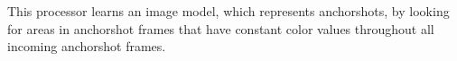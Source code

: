 This processor learns an image model, which represents anchorshots, by looking for areas in anchorshot frames that have constant color values throughout all incoming anchorshot frames.